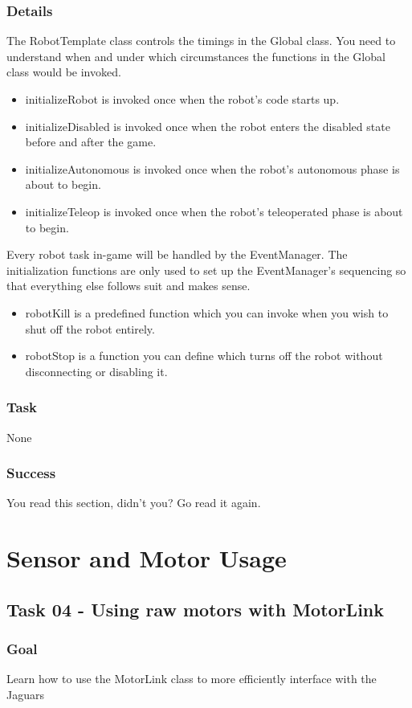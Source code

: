 \documentclass[a4paper]{article}
\begin{document}
\subsubsection{Details} The RobotTemplate class controls the timings in the Global class. You need to understand when and under which circumstances the functions in the Global class would be invoked. \begin{itemize}\item{initializeRobot is invoked once when the robot's code starts up.}\item{initializeDisabled is invoked once when the robot enters the disabled state before and after the game.}\item{initializeAutonomous is invoked once when the robot's autonomous phase is about to begin.}\item{initializeTeleop is invoked once when the robot's teleoperated phase is about to begin.}\end{itemize}

Every robot task in-game will be handled by the EventManager. The initialization functions are only used to set up the EventManager's sequencing so that everything else follows suit and makes sense. \begin{itemize}\item{robotKill is a predefined function which you can invoke when you wish to shut off the robot entirely.}\item{robotStop is a function you can define which turns off the robot without disconnecting or disabling it.}\end{itemize}
\subsubsection{Task} None
\subsubsection{Success} You read this section, didn't you? Go read it again.


\section{Sensor and Motor Usage}\setcounter{subsection}{3}

\subsection{Task 04 - Using raw motors with MotorLink}
\subsubsection{Goal} Learn how to use the MotorLink class to more efficiently interface with the Jaguars
\end{document}

